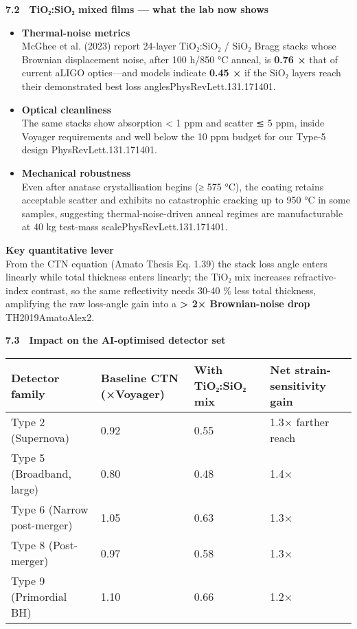 \documentclass[]{article}
\begin{document}
\textbf{7.2 TiO₂:SiO₂ mixed films --- what the lab now shows}

\begin{itemize}
\item
  \textbf{Thermal-noise metrics}\\
  McGhee et al. (2023) report 24-layer TiO₂:SiO₂ / SiO₂ Bragg stacks
  whose Brownian displacement noise, after 100 h/850 °C anneal, is
  \textbf{0.76 ×} that of current aLIGO optics---and models indicate
  \textbf{0.45 ×} if the SiO₂ layers reach their demonstrated best loss
  angles ​PhysRevLett.131.171401.
\item
  \textbf{Optical cleanliness}\\
  The same stacks show absorption \textless{} 1 ppm and scatter ≲ 5 ppm,
  inside Voyager requirements and well below the 10 ppm budget for our
  Type-5 design ​PhysRevLett.131.171401.
\item
  \textbf{Mechanical robustness}\\
  Even after anatase crystallisation begins (≥ 575 °C), the coating
  retains acceptable scatter and exhibits no catastrophic cracking up to
  950 °C in some samples, suggesting thermal-noise-driven anneal regimes
  are manufacturable at 40 kg test-mass scale ​PhysRevLett.131.171401.
\end{itemize}

\textbf{Key quantitative lever}\\
From the CTN equation (Amato Thesis Eq. 1.39) the stack loss angle
enters linearly while total thickness enters linearly; the TiO₂ mix
increases refractive-index contrast, so the same reflectivity needs
30-40 \% less total thickness, amplifying the raw loss-angle gain into a
\textbf{\textgreater{} 2× Brownian-noise drop} ​TH2019AmatoAlex2.

\textbf{7.3 Impact on the AI-optimised detector set}

\begin{longtable}[]{@{}llll@{}}
\toprule
\textbf{Detector family} & \textbf{Baseline CTN (×Voyager)} &
\textbf{With TiO₂:SiO₂ mix} & \textbf{Net strain-sensitivity
gain}\tabularnewline
\midrule
\endhead
Type 2 (Supernova) & 0.92 & 0.55 & 1.3× farther reach\tabularnewline
Type 5 (Broadband, large) & 0.80 & 0.48 & 1.4×\tabularnewline
Type 6 (Narrow post-merger) & 1.05 & 0.63 & 1.3×\tabularnewline
Type 8 (Post-merger) & 0.97 & 0.58 & 1.3×\tabularnewline
Type 9 (Primordial BH) & 1.10 & 0.66 & 1.2×\tabularnewline
\bottomrule
\end{longtable}
\end{document}
